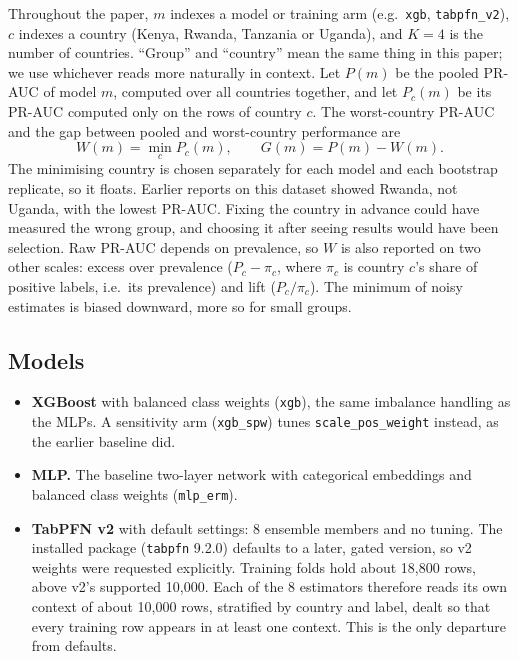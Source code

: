 \documentclass[11pt]{article}
\newcommand{\arm}[1]{\texttt{#1}}
\begin{document}
Throughout the paper, $m$ indexes a model or training arm (e.g.\ \arm{xgb}, \arm{tabpfn\_v2}), $c$ indexes a country (Kenya, Rwanda, Tanzania or Uganda), and $K = 4$ is the number of countries. ``Group'' and ``country'' mean the same thing in this paper; we use whichever reads more naturally in context. Let $P(m)$ be the pooled PR-AUC of model $m$, computed over all countries together, and let $P_c(m)$ be its PR-AUC computed only on the rows of country $c$. The worst-country PR-AUC and the gap between pooled and worst-country performance are
\begin{equation}
  W(m) = \min_{c} P_c(m), \qquad G(m) = P(m) - W(m).
\end{equation}
The minimising country is chosen separately for each model and each bootstrap replicate, so it floats. Earlier reports on this dataset showed Rwanda, not Uganda, with the lowest PR-AUC. Fixing the country in advance could have measured the wrong group, and choosing it after seeing results would have been selection. Raw PR-AUC depends on prevalence, so $W$ is also reported on two other scales: excess over prevalence ($P_c - \pi_c$, where $\pi_c$ is country $c$'s share of positive labels, i.e.\ its prevalence) and lift ($P_c / \pi_c$). The minimum of noisy estimates is biased downward, more so for small groups.

\subsection{Models}

\begin{itemize}
  \item \textbf{XGBoost} \citep{chen2016xgboost} with balanced class weights (\arm{xgb}), the same imbalance handling as the MLPs. A sensitivity arm (\arm{xgb\_spw}) tunes \texttt{scale\_pos\_weight} instead, as the earlier baseline did.
  \item \textbf{MLP.} The baseline two-layer network with categorical embeddings and balanced class weights (\arm{mlp\_erm}).
  \item \textbf{TabPFN v2} \citep{hollmann2025accurate} with default settings: 8 ensemble members and no tuning. The installed package (\texttt{tabpfn} 9.2.0) defaults to a later, gated version, so v2 weights were requested explicitly. Training folds hold about 18,800 rows, above v2's supported 10,000. Each of the 8 estimators therefore reads its own context of about 10,000 rows, stratified by country and label, dealt so that every training row appears in at least one context. This is the only departure from defaults.
\end{itemize}
\end{document}
